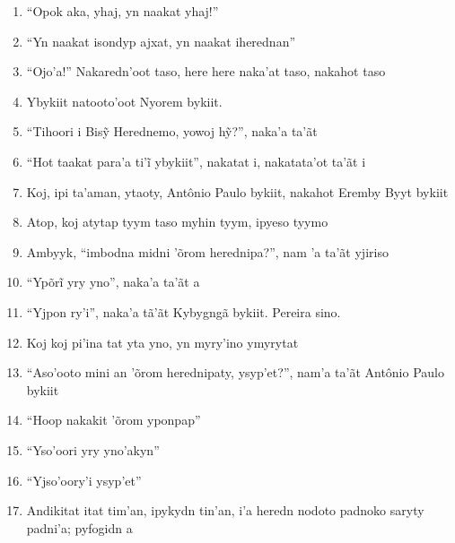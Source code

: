 \begin{enumerate}
 \item``Opok aka, yhaj, yn naakat yhaj!''

 \item ``Yn naakat isondyp ajxat, yn naakat iherednan''

 \item ``Ojo'a!'' Nakaredn'oot taso, here here naka'at taso, nakahot taso

 \begin{center}\end{center}

 \item Ybykiit natooto'oot Nyorem bykiit.

 \item ``Tihoori i Bisỹ Herednemo, yowoj hỹ?'', naka’a ta’ãt

 \item ``Hot taakat para’a ti’ĩ ybykiit'', nakatat i, nakatata’ot ta’ãt i

 \item Koj, ipi ta'aman, ytaoty, Antônio Paulo bykiit, nakahot Eremby Byyt bykiit

 \item Atop, koj atytap tyym taso myhin tyym, ipyeso tyymo

 \item Ambyyk, ``imbodna midni 'õrom herednipa?'', nam 'a ta'ãt yjiriso

 \item ``Ypõrĩ yry yno'', naka’a ta’ãt a

 \item ``Yjpon ry'i'', naka'a tã'ãt Kybygngã bykiit. Pereira sino.

 \item Koj koj pi'ina tat yta yno, yn myry'ino ymyrytat

 \begin{center}\end{center}

 \item ``Aso'ooto mini an 'õrom herednipaty, ysyp'et?'', nam'a ta'ãt
 Antônio Paulo bykiit

 \item ``Hoop nakakit 'õrom yponpap''

 \item ``Yso'oori yry yno'akyn''

 \item ``Yjso'oory'i ysyp'et''

 \item Andikitat itat tim'an, ipykydn tin'an, i'a heredn nodoto padnoko
 saryty padni'a; pyfogidn a


\end{enumerate}
